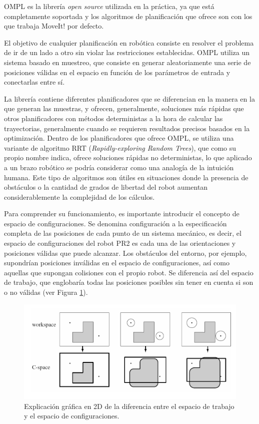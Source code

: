 \documentclass[12pt,spanish,chapterprefix, numbers=noenddot]{book}
\numberwithin{equation}{section}
\numberwithin{figure}{section}
\begin{document}
OMPL es la librería \textit{open source} utilizada en la práctica, ya que está completamente soportada y los algoritmos de planificación que ofrece son con los que trabaja MoveIt! por defecto. \cite{moveit_planners}

El objetivo de cualquier planificación en robótica consiste en resolver el problema de ir de un lado a otro sin violar las restricciones establecidas. OMPL utiliza un sistema basado en muestreo, que consiste en generar aleatoriamente una serie de posiciones válidas en el espacio en función de los parámetros de entrada y conectarlas entre sí.

La librería contiene diferentes planificadores que se diferencian en la manera en la que generan las muestras, y ofrecen, generalmente, soluciones más rápidas que otros planificadores con métodos deterministas  a la hora de calcular las trayectorias, generalmente cuando se requieren resultados precisos basados en la optimización.
Dentro de los planificadores que ofrece OMPL, se utiliza una variante de algoritmo RRT (\textit{Rapidly-exploring Random Trees}), que como su propio nombre indica, ofrece soluciones rápidas no deterministas, lo que aplicado a un brazo robótico se podría considerar como una analogía de la intuición humana. Este tipo de algoritmos son útiles en situaciones donde la presencia de obstáculos o la cantidad de grados de libertad del robot aumentan considerablemente la complejidad de los cálculos.  

Para comprender su funcionamiento, es importante introducir el concepto de espacio de configuraciones. Se denomina configuración a la especificación completa de las posiciones de cada punto de un sistema mecánico, es decir, el espacio de configuraciones del robot PR2 es cada una de las orientaciones y posiciones válidas que puede alcanzar. Los obstáculos del entorno, por ejemplo, supondrían posiciones inválidas en el espacio de configuraciones, así como aquellas que supongan colisiones con el propio robot. Se diferencia así del espacio de trabajo, que englobaría todas las posiciones posibles sin tener en cuenta si son o no válidas (ver Figura \ref{fig:cspace}). 

\begin{figure}[hbt!]
\centering
\includegraphics[width=12cm]{Figs/cspace_vs_workspace.png}
\par
\caption{\label{fig:cspace}Explicación gráfica en 2D de la diferencia entre el espacio de trabajo y el espacio de configuraciones.}
\end{figure}
\end{document}
